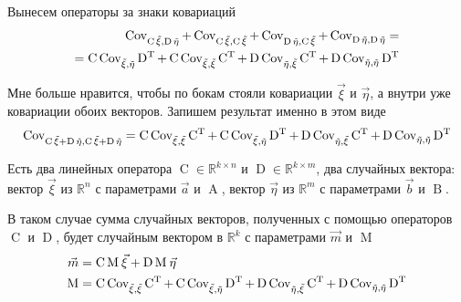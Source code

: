 Вынесем операторы за знаки ковариаций
\begin{align*}
\operatorname{Cov^{}_{\operatorname{C} \vec{\xi}, \operatorname{D} \vec{\eta}}}
    + \operatorname{Cov^{}_{\operatorname{C} \vec{\xi}, \operatorname{C} \vec{\xi}}}
    + \operatorname{Cov^{}_{\operatorname{D} \vec{\eta}, \operatorname{C} \vec{\xi}}}
    + \operatorname{Cov^{}_{\operatorname{D} \vec{\eta}, \operatorname{D} \vec{\eta}}} = \\
= \operatorname{C} \operatorname{Cov^{}_{\vec{\xi}, \vec{\eta}}} \operatorname{D^T}
    + \operatorname{C} \operatorname{Cov^{}_{\vec{\xi}, \vec{\xi}}} \operatorname{C^T}
    + \operatorname{D} \operatorname{Cov^{}_{\vec{\eta}, \vec{\xi}}} \operatorname{C^T}
    + \operatorname{D} \operatorname{Cov^{}_{\vec{\eta}, \vec{\eta}}} \operatorname{D^T}
\end{align*}

Мне больше нравится, чтобы по бокам стояли ковариации $\vec{\xi}$ и
$\vec{\eta}$, а внутри уже ковариации обоих векторов. Запишем результат именно в
этом виде
\begin{align*}
\operatorname{Cov^{}_{\operatorname{C} \vec{\xi} + \operatorname{D} \vec{\eta}, \operatorname{C} \vec{\xi} + \operatorname{D} \vec{\eta}}}
    = \operatorname{C} \operatorname{Cov^{}_{\vec{\xi}, \vec{\xi}}} \operatorname{C^T}
        + \operatorname{C} \operatorname{Cov^{}_{\vec{\xi}, \vec{\eta}}} \operatorname{D^T}
        + \operatorname{D} \operatorname{Cov^{}_{\vec{\eta}, \vec{\xi}}} \operatorname{C^T}
        + \operatorname{D} \operatorname{Cov^{}_{\vec{\eta}, \vec{\eta}}} \operatorname{D^T}
\end{align*}

\begin{affirmation}\label{affirmation:randomVector:linearTransformations}
    Есть два линейных оператора $\operatorname{C} \in \mathbb{R}^{k \times n}$
    и $\operatorname{D} \in \mathbb{R}^{k \times m}$, два случайных вектора:
    вектор $\vec{\xi}$ из $\mathbb{R}^n$ с параметрами $\vec{a}$ и
    $\operatorname{A}$, вектор $\vec{\eta}$ из $\mathbb{R}^m$ с параметрами
    $\vec{b}$ и $\operatorname{B}$.

    В таком случае сумма случайных векторов, полученных с помощью операторов
    $\operatorname{C}$ и $\operatorname{D}$, будет случайным вектором
    в $\mathbb{R}^k$ с параметрами $\vec{m}$ и $\operatorname{M}$
    \begin{align*}
        \vec{m} &= \operatorname{C} \operatorname{M}_{} \vec{\xi}
            + \operatorname{D} \operatorname{M}_{} \vec{\eta} \\
        \operatorname{M} &= \operatorname{C} \operatorname{Cov^{}_{\vec{\xi}, \vec{\xi}}} \operatorname{C^T}
            + \operatorname{C} \operatorname{Cov^{}_{\vec{\xi}, \vec{\eta}}} \operatorname{D^T}
            + \operatorname{D} \operatorname{Cov^{}_{\vec{\eta}, \vec{\xi}}} \operatorname{C^T}
            + \operatorname{D} \operatorname{Cov^{}_{\vec{\eta}, \vec{\eta}}} \operatorname{D^T}
    \end{align*}
\end{affirmation}
